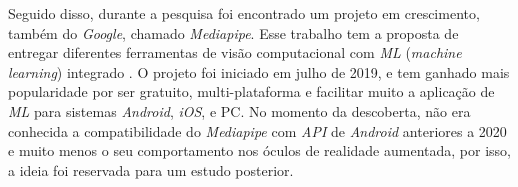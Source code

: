 Seguido disso, durante a pesquisa foi encontrado um projeto em crescimento, também do \textit{Google}, chamado \textit{Mediapipe}. Esse trabalho tem a proposta de entregar diferentes ferramentas de visão computacional com \textit{ML} (\textit{machine learning}) integrado \cite{mediapipe-docs}. O projeto foi iniciado em julho de 2019, e tem ganhado mais popularidade por ser gratuito, multi-plataforma e facilitar muito a aplicação de \textit{ML} para sistemas \textit{Android}, \textit{iOS}, e PC. No momento da descoberta, não era conhecida a compatibilidade do \textit{Mediapipe} com \textit{API} de \textit{Android} anteriores a 2020 e muito menos o seu comportamento nos óculos de realidade aumentada, por isso, a ideia foi reservada para um estudo posterior.


